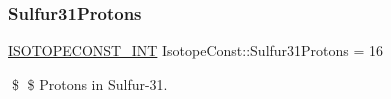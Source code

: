 \subsubsection{\texorpdfstring{Sulfur31\+Protons}{Sulfur31Protons}}
{\footnotesize\ttfamily \mbox{\hyperlink{group___isotope_const-_macros_ga5f18360b3e99483a35c32d789e62621c}{I\+S\+O\+T\+O\+P\+E\+C\+O\+N\+S\+T\+\_\+\+I\+NT}} Isotope\+Const\+::\+Sulfur31\+Protons = 16}

\$ \$ Protons in Sulfur-\/31. 